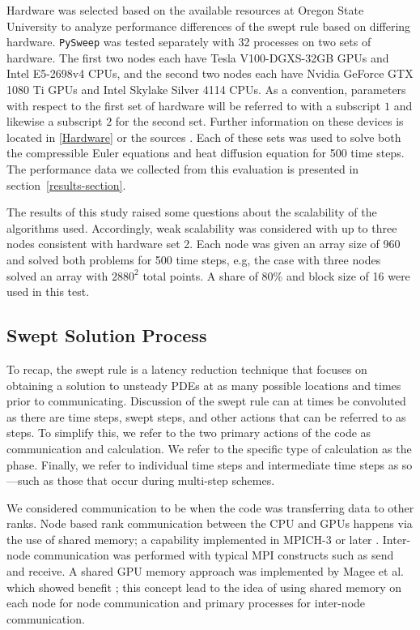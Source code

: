 \documentclass[review]{elsarticle}
\def\oldCPU{s}
\def\oldGPU{s}
\def\newCPU{s}
\def\newGPU{s}
\def\pysweep{\texttt{PySweep}}
\def\oldCPU{Intel Skylake Silver 4114} %
\def\oldGPU{Nvidia GeForce GTX 1080 Ti}
\def\newCPU{Intel E5-2698v4} %
\def\newGPU{Tesla V100-DGXS-32GB}
\begin{document}
\par
Hardware was selected based on the available resources at Oregon State University to analyze performance differences of the swept rule based on differing hardware. \pysweep{} was tested separately with 32 processes on two sets of hardware. The first two nodes each have \newGPU{} GPUs and \newCPU{} CPUs, and the second two nodes each have \oldGPU{} GPUs and \oldCPU{} CPUs. As a convention, parameters with respect to the first set of hardware will be referred to with a subscript $1$ and likewise a subscript $2$ for the second set. Further information on these devices is located in \ref{Hardware} or the sources \cite{Intel123550,Intel91753,NVIDIANVIDIA,GeForceGeForce}. Each of these sets was used to solve both the compressible Euler equations and heat diffusion equation for 500 time steps. The performance data we collected from this evaluation is presented in section~\ref{results-section}. 

\par 
The results of this study raised some questions about the scalability of the algorithms used. Accordingly, weak scalability was considered with up to three nodes consistent with hardware set 2. Each node was given an array size of 960 and solved both problems for 500 time steps, e.g, the case with three nodes solved an array with $2880^2$ total points. A share of 80\% and block size of 16 were used in this test. 

\subsection{Swept Solution Process}
\label{swept-process-section}
To recap, the swept rule is a latency reduction technique that focuses on obtaining a solution to unsteady PDEs at as many possible locations and times prior to communicating. Discussion of the swept rule can at times be convoluted as there are time steps, swept steps, and other actions that can be referred to as steps. To simplify this, we refer to the two primary actions of the code as communication and calculation. We refer to the specific type of calculation as the phase. Finally, we refer to individual time steps and intermediate time steps as so---such as those that occur during multi-step schemes. 

\par
 We considered communication to be when the code was transferring data to other ranks. Node based rank communication between the CPU and GPUs happens via the use of shared memory; a capability implemented in MPICH-3 or later \cite{Hoefler2013MPIMemory}. Inter-node communication was performed with typical MPI constructs such as send and receive. A shared GPU memory approach was implemented by Magee et al. which showed benefit \cite{Magee2018AcceleratingDecomposition}; this concept lead to the idea of using shared memory on each node for node communication and primary processes for inter-node communication.
 
\end{document}
